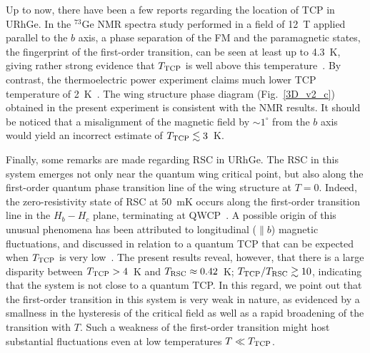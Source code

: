 \documentclass[twocolumn, aps, superscriptaddress, amsfonts,floatfix]{revtex4}%
\begin{document}
{%

Up to now, there have been a few reports regarding the location of TCP in URhGe.
In the $^{73}$Ge NMR spectra study performed in a field of 12~T applied parallel to the $b$ axis, a phase separation of the FM and the paramagnetic states, the fingerprint of the first-order transition,  can be seen at least up to 4.3~K, giving rather strong evidence that $T_{\rm TCP}$ is well above this temperature~\cite{kotegawa201573ge}. 
By contrast, the thermoelectric power experiment claims much lower TCP temperature of 2~K~\cite{gourgout2016collapse}.
The wing structure phase diagram (Fig.~\ref{3D_v2_c}) obtained in the present experiment is consistent with the NMR results. It should be noticed that a misalignment of the magnetic field by $\sim 1^\circ$ from the $b$ axis would yield an incorrect estimate  of $T_{\rm TCP}\lesssim 3$~K.

Finally, some remarks are made regarding RSC in URhGe. The RSC in this system emerges not only near the quantum wing  critical point, but also along the first-order quantum phase transition line of the wing structure at $T=0$. Indeed, the zero-resistivity state of RSC at 50~mK occurs along the first-order transition line in the $H_b-H_c$ plane, terminating at QWCP~\cite{levy2005magnetic}.
A possible origin of this unusual phenomena has been attributed to longitudinal ($\parallel b$) magnetic fluctuations, and discussed in relation to a quantum TCP that can be expected when $T_{\rm TCP}$ is very low~\cite{levy2005magnetic,levy2009coexistence,tokunaga2015reentrant}.
The present results reveal, however, that there is a large disparity between $T_{\rm TCP}>4$~K and $T_{\rm RSC}\approx 0.42$~K; $T_{\rm TCP}/T_{\rm RSC}\gtrsim 10$, indicating that the system is not close to a quantum TCP. In this regard, we point out that the first-order transition in this system is very weak in nature, as evidenced by a smallness in the hysteresis of the critical field as well as a rapid broadening of the transition with $T$. Such a weakness of the first-order transition might host substantial fluctuations even at low temperatures $T\ll T_{\rm TCP}$.

}
\end{document}
